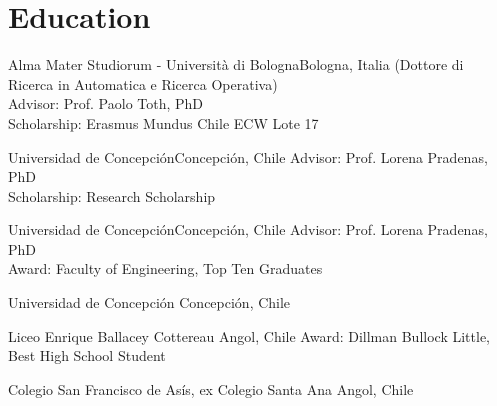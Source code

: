 \section{Education}

{Alma Mater Studiorum - Universit\`a di Bologna}{Bologna, Italia}{}
{(Dottore di Ricerca in Automatica e Ricerca Operativa) \\
Advisor: Prof. Paolo Toth, PhD \\
Scholarship: Erasmus Mundus Chile ECW Lote 17}

{Universidad de Concepci\'on}{Concepci\'on, Chile}{}
{%
Advisor: Prof. Lorena Pradenas, PhD \\
Scholarship: Research Scholarship}

{Universidad de Concepci\'on}{Concepci\'on, Chile}{}
{%
Advisor: Prof. Lorena Pradenas, PhD \\
Award: Faculty of Engineering, Top Ten Graduates}
	
{Universidad de Concepci\'on}
{Concepci\'on, Chile}{}
{}

{Liceo Enrique Ballacey Cottereau}
{Angol, Chile}{}
{Award: Dillman Bullock Little, Best High School Student}

{Colegio San Francisco de As\'is, ex Colegio Santa Ana}
{Angol, Chile}{}
{}

\clearpage